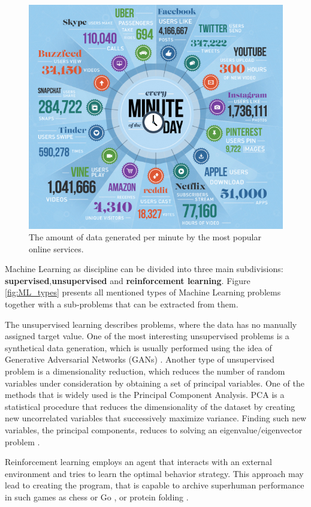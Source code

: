 \begin{figure}[h]
\centering
\includegraphics[scale=0.8]{figures/big_data.jpg}
\caption{The amount of data generated per minute by the most popular online services.
\label{fig:big_data}}
\end{figure}

Machine Learning as discipline can be divided into three main subdivisions: \textbf{supervised},\textbf{unsupervised} and \textbf{reinforcement learning}. Figure \ref{fig:ML_types} presents all mentioned types of Machine Learning problems together with a sub-problems that can be extracted from them. 

The unsupervised learning describes problems, where the data has no manually assigned target value. One of the most interesting unsupervised problems is a synthetical data generation, which is usually performed using the idea of Generative Adversarial Networks (GANs) \cite{GAN}. Another type of unsupervised problem is a dimensionality reduction, which reduces the number of random variables under consideration by obtaining a set of principal variables. 
One of the methods that is widely used is the Principal Component Analysis. 
PCA is a statistical procedure that reduces the dimensionality of the dataset by creating new uncorrelated variables that successively maximize variance. Finding such new variables, the principal components, reduces to solving an eigenvalue/eigenvector problem \cite{PCA}. 

Reinforcement learning employs an agent that interacts with an external environment and tries to learn the optimal behavior strategy. This approach may lead to creating the program, that is capable to archive superhuman performance in such games as chess or Go \cite{alphago}, or protein folding \cite{alpha_fold}.   

